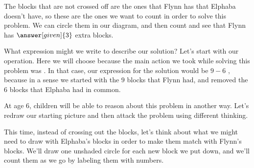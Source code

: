 \documentclass{ximera}
\begin{document}
\begin{example}
The blocks that are not crossed off are the ones that Flynn has that Elphaba doesn't have, so these are the ones we want to count in order to solve this problem. We can circle them in our diagram, and then count and see that Flynn has $\answer[given]{3}$ extra blocks.

\begin{image}
\end{image}

What expression might we write to describe our solution? Let's start with our operation. Here we will choose  because the main action we took while solving this problem was . In that case, our expression for the solution would be $9 - 6$ , because in a sense we started with the $9$ blocks that Flynn had, and removed the $6$ blocks that Elphaba had in common.

At age 6, children will be able to reason about this problem in another way. Let's redraw our starting picture and then attack the problem using different thinking. 

\begin{image}
\end{image}

This time, instead of crossing out the blocks, let's think about what we might need to draw with Elphaba's blocks in order to make them match with Flynn's blocks. We'll draw one unshaded circle for each new block we put down, and we'll count them as we go by labeling them with numbers.

\begin{image}
\end{image}


\end{example}
\end{document}
